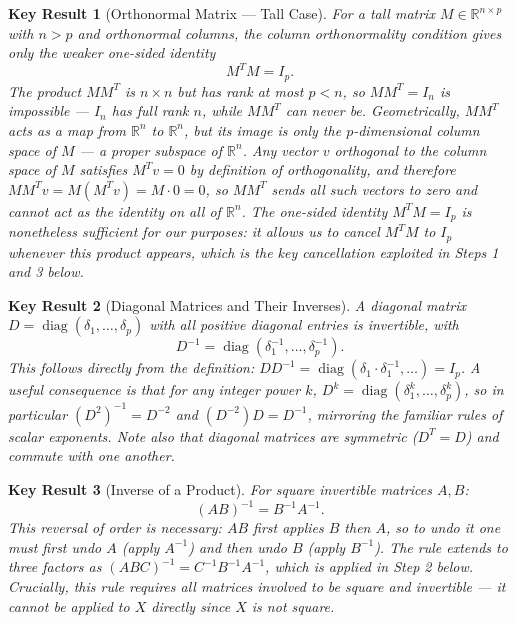 \documentclass{article}
\newtheorem*{result}{Key Result}
\begin{document}
\begin{result}[Orthonormal Matrix --- Tall Case]
For a tall matrix $M \in \mathbb{R}^{n \times p}$ with $n > p$ and orthonormal columns,
the column orthonormality condition gives only the weaker one-sided identity
\[
    M^T M = I_p.
\]
The product $MM^T$ is $n \times n$ but has rank at most $p < n$, so $MM^T = I_n$ is
impossible --- $I_n$ has full rank $n$, while $MM^T$ can never be. Geometrically,
$MM^T$ acts as a map from $\mathbb{R}^n$ to $\mathbb{R}^n$, but its image is only the
$p$-dimensional column space of $M$ --- a proper subspace of $\mathbb{R}^n$. Any vector
$v$ orthogonal to the column space of $M$ satisfies $M^Tv = 0$ by definition of
orthogonality, and therefore $MM^Tv = M(M^Tv) = M \cdot 0 = 0$, so $MM^T$ sends all
such vectors to zero and cannot act as the identity on all of $\mathbb{R}^n$. The
one-sided identity $M^TM = I_p$ is nonetheless sufficient for our purposes: it allows
us to cancel $M^TM$ to $I_p$ whenever this product appears, which is the key
cancellation exploited in Steps 1 and 3 below.
\end{result}

\begin{result}[Diagonal Matrices and Their Inverses]
A diagonal matrix $D = \operatorname{diag}(\delta_1, \ldots, \delta_p)$ with all positive diagonal
entries is invertible, with
\[
    D^{-1} = \operatorname{diag}(\delta_1^{-1}, \ldots, \delta_p^{-1}).
\]
This follows directly from the definition: $DD^{-1} = \operatorname{diag}(\delta_1 \cdot
\delta_1^{-1}, \ldots) = I_p$. A useful consequence is that for any integer power $k$,
$D^k = \operatorname{diag}(\delta_1^k, \ldots, \delta_p^k)$, so in particular
$(D^2)^{-1} = D^{-2}$ and $(D^{-2})D = D^{-1}$, mirroring the familiar rules of
scalar exponents. Note also that diagonal matrices are symmetric ($D^T = D$) and
commute with one another.
\end{result}

\begin{result}[Inverse of a Product]
For square invertible matrices $A, B$:
\[
    (AB)^{-1} = B^{-1}A^{-1}.
\]
This reversal of order is necessary: $AB$ first applies $B$ then $A$, so to undo it
one must first undo $A$ (apply $A^{-1}$) and then undo $B$ (apply $B^{-1}$). The rule
extends to three factors as $(ABC)^{-1} = C^{-1}B^{-1}A^{-1}$, which is applied in
Step 2 below. Crucially, this rule requires all matrices involved to be \emph{square}
and invertible --- it cannot be applied to $X$ directly since $X$ is not square.
\end{result}
\end{document}
